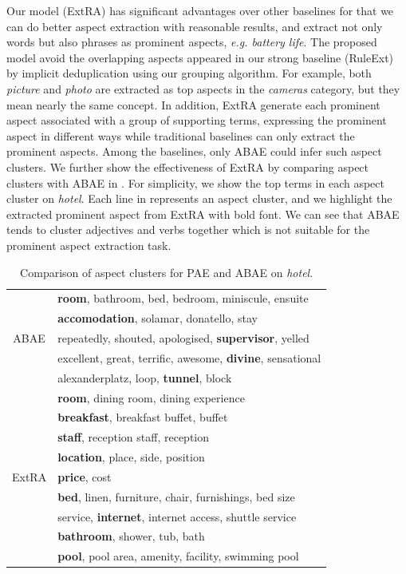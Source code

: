 Our model (ExtRA) has significant advantages over other baselines for that we can do better aspect extraction with reasonable results, and extract not only words but also phrases as prominent aspects, \textit{e.g. battery life}. 
The proposed model avoid the overlapping aspects appeared in our strong baseline 
(RuleExt) by implicit deduplication using our grouping algorithm. 
For example, both \textit{picture} and \textit{photo} are extracted as top aspects in
the \textit{cameras} category, 
but they mean nearly the same concept. 
In addition, ExtRA generate each prominent aspect associated with
a group of supporting terms, expressing the prominent aspect in different ways
while traditional baselines can only extract the prominent aspects.
Among the baselines, only ABAE could infer such aspect clusters.
We further show the effectiveness of ExtRA by comparing
aspect clusters with ABAE in .
For simplicity, we show the top terms in each aspect cluster on \textit{hotel}.
Each line in  represents an aspect cluster, and
we highlight the extracted prominent aspect from ExtRA with bold font.
We can see that ABAE tends to cluster adjectives and verbs together
which is not suitable for the prominent aspect extraction task.

\begin{table}[!th]
	\small
	\centering
	\caption{Comparison of aspect clusters for PAE and ABAE on \textit{hotel}.}
	\label{table:aspect_clusters}
	\begin{tabular}{|c|l|}
		\hline
		\multirow{5}{*}{ABAE} & \textbf{room}, bathroom, bed, bedroom, miniscule, ensuite   \\
		&  \textbf{accomodation}, solamar, donatello, stay   \\ 
		&  repeatedly, shouted, apologised, \textbf{supervisor}, yelled   \\ 
		&  excellent, great, terrific, awesome, \textbf{divine}, sensational  \\ 
		&  alexanderplatz, loop, \textbf{tunnel}, block   \\  \cline{2-2}
		\hline
		\hline
		\multirow{9}{*}{ExtRA} & \textbf{room}, dining room, dining experience   \\
		&  \textbf{breakfast}, breakfast buffet, buffet \\ 
		&  \textbf{staff}, reception staff, reception   \\ 
		&  \textbf{location}, place, side, position   \\ 
		&  \textbf{price}, cost   \\  
		&  \textbf{bed}, linen, furniture, chair, furnishings, bed size \\
		&  service, \textbf{internet}, internet access, shuttle service \\
		&  \textbf{bathroom}, shower, tub, bath \\
		&  \textbf{pool}, pool area, amenity, facility, swimming pool \\ \cline{2-2}
		\hline
	\end{tabular}
\end{table}

